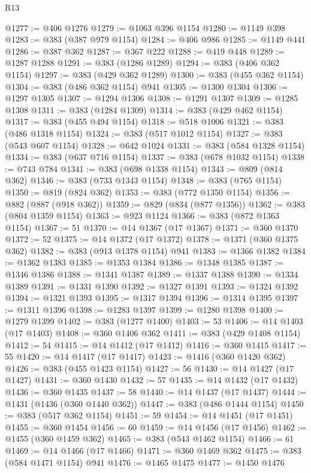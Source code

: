 \begin{lexlean}{R13}
\begin{coremodule}
@1277 := @406 @1276
@1279 := @1063 @396 @1154
@1280 := @1149 @398
@1283 := @383 (@387 @979 @1154)
@1284 := @406 @986
@1285 := @1149 @441
@1286 := @387 @362
@1287 := @367 @222
@1288 := @419 @448
@1289 := @1287 @1288
@1291 := @383 (@1286 @1289)
@1294 := @383 (@406 @362 @1154)
@1297 := @383 (@429 @362 @1289)
@1300 := @383 (@455 @362 @1154)
@1304 := @383 (@486 @362 @1154) @941
@1305 := @1300 @1304
@1306 := @1297 @1305
@1307 := @1294 @1306
@1308 := @1291 @1307
@1309 := @1285 @1308
@1311 := @383 (@1284 @1309)
@1314 := @383 (@429 @462 @1154)
@1317 := @383 (@455 @494 @1154)
@1318 := @518 @1006
@1321 := @383 (@486 @1318 @1154)
@1324 := @383 (@517 @1012 @1154)
@1327 := @383 (@543 @607 @1154)
@1328 := @642 @1024
@1331 := @383 (@584 @1328 @1154)
@1334 := @383 (@637 @716 @1154)
@1337 := @383 (@678 @1032 @1154)
@1338 := @743 @784
@1341 := @383 (@698 @1338 @1154)
@1343 := @809 (@814 @362)
@1346 := @383 (@733 @1343 @1154)
@1348 := @383 (@765 @1154)
@1350 := @819 (@824 @362)
@1353 := @383 (@772 @1350 @1154)
@1356 := @882 (@887 (@918 @362))
@1359 := @829 (@834 (@877 @1356))
@1362 := @383 (@804 @1359 @1154)
@1363 := @923 @1124
@1366 := @383 (@872 @1363 @1154)
@1367 := 51
@1370 := @14 @1367 (@17 @1367)
@1371 := @360 @1370
@1372 := 52
@1375 := @14 @1372 (@17 @1372)
@1378 := @1371 (@360 @1375 @362)
@1382 := @383 (@913 @1378 @1154) @941
@1383 := @1366 @1382
@1384 := @1362 @1383
@1385 := @1353 @1384
@1386 := @1348 @1385
@1387 := @1346 @1386
@1388 := @1341 @1387
@1389 := @1337 @1388
@1390 := @1334 @1389
@1391 := @1331 @1390
@1392 := @1327 @1391
@1393 := @1324 @1392
@1394 := @1321 @1393
@1395 := @1317 @1394
@1396 := @1314 @1395
@1397 := @1311 @1396
@1398 := @1283 @1397
@1399 := @1280 @1398
@1400 := @1279 @1399
@1402 := @383 (@1277 @1400)
@1403 := 53
@1406 := @14 @1403 (@17 @1403)
@1408 := @360 @1406 @362
@1411 := @383 (@429 @1408 @1154)
@1412 := 54
@1415 := @14 @1412 (@17 @1412)
@1416 := @360 @1415
@1417 := 55
@1420 := @14 @1417 (@17 @1417)
@1423 := @1416 (@360 @1420 @362)
@1426 := @383 (@455 @1423 @1154)
@1427 := 56
@1430 := @14 @1427 (@17 @1427)
@1431 := @360 @1430
@1432 := 57
@1435 := @14 @1432 (@17 @1432)
@1436 := @360 @1435
@1437 := 58
@1440 := @14 @1437 (@17 @1437)
@1444 := @1431 (@1436 (@360 @1440 @362))
@1447 := @383 (@486 @1444 @1154)
@1450 := @383 (@517 @362 @1154)
@1451 := 59
@1454 := @14 @1451 (@17 @1451)
@1455 := @360 @1454
@1456 := 60
@1459 := @14 @1456 (@17 @1456)
@1462 := @1455 (@360 @1459 @362)
@1465 := @383 (@543 @1462 @1154)
@1466 := 61
@1469 := @14 @1466 (@17 @1466)
@1471 := @360 @1469 @362
@1475 := @383 (@584 @1471 @1154) @941
@1476 := @1465 @1475
@1477 := @1450 @1476

\end{coremodule}
\end{lexlean}
